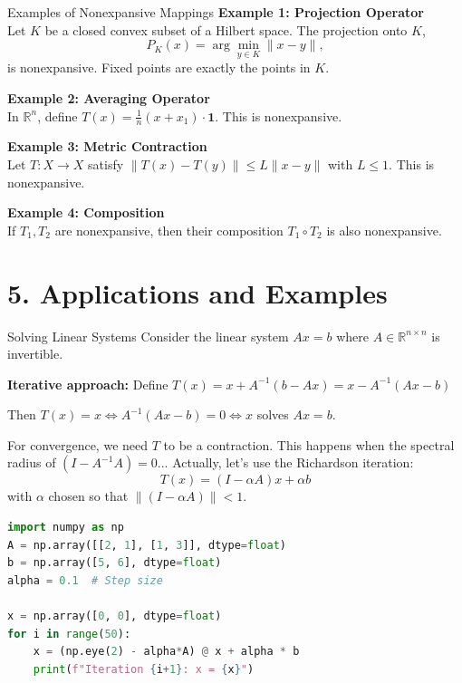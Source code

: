 \documentclass[aspectratio=169,10pt]{beamer}
\begin{document}
\begin{frame}{Examples of Nonexpansive Mappings}
    \textbf{Example 1: Projection Operator} \\
    Let $K$ be a closed convex subset of a Hilbert space. The projection onto $K$,
    \[
        P_K(x) = \arg\min_{y \in K} \|x - y\|,
    \]
    is nonexpansive. Fixed points are exactly the points in $K$.

    \vspace{0.4cm}
    \textbf{Example 2: Averaging Operator} \\
    In $\mathbb{R}^n$, define $T(x) = \frac{1}{n}(x + x_1) \cdot \mathbf{1}$. This is nonexpansive.

    \vspace{0.4cm}
    \textbf{Example 3: Metric Contraction} \\
    Let $T: X \to X$ satisfy $\|T(x) - T(y)\| \leq L \|x - y\|$ with $L \leq 1$. This is nonexpansive.

    \vspace{0.4cm}
    \textbf{Example 4: Composition} \\
    If $T_1, T_2$ are nonexpansive, then their composition $T_1 \circ T_2$ is also nonexpansive.
\end{frame}

\section{5. Applications and Examples}

\begin{frame}[fragile]{Solving Linear Systems}
    Consider the linear system $Ax = b$ where $A \in \mathbb{R}^{n \times n}$ is invertible.

    \vspace{0.3cm}
    \textbf{Iterative approach:} Define $T(x) = x + A^{-1}(b - Ax) = x - A^{-1}(Ax - b)$

    \vspace{0.3cm}
    Then $T(x) = x \Leftrightarrow A^{-1}(Ax - b) = 0 \Leftrightarrow x$ solves $Ax = b$.

    \vspace{0.3cm}
    For convergence, we need $T$ to be a contraction. This happens when the spectral radius of $(I - A^{-1}A) = 0$... Actually, let's use the Richardson iteration:
    \[
        T(x) = (I - \alpha A) x + \alpha b
    \]
    with $\alpha$ chosen so that $\|(I - \alpha A)\| < 1$.

    \vspace{0.3cm}
    \begin{lstlisting}[language=Python]
import numpy as np
A = np.array([[2, 1], [1, 3]], dtype=float)
b = np.array([5, 6], dtype=float)
alpha = 0.1  # Step size

x = np.array([0, 0], dtype=float)
for i in range(50):
    x = (np.eye(2) - alpha*A) @ x + alpha * b
    print(f"Iteration {i+1}: x = {x}")
    \end{lstlisting}
\end{frame}
\end{document}
